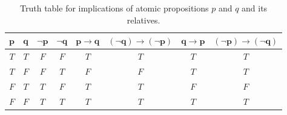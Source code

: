 \begin{table}[h]
    \centering
    \begin{tabular}{|c|c||c|c|c|c|c|c|}
        \hline $\mathbf{p}$ & $\mathbf{q}$ & $\mathbf{\neg p}$ & $\mathbf{\neg q}$ & $\mathbf{p \to q}$ & $\mathbf{(\neg q) \to (\neg p)}$ & $\mathbf{q \to p}$ & $\mathbf{(\neg p) \to (\neg q)}$ \\
        \hline \cellcolor{green!25}$T$ & \cellcolor{green!25}$T$ & \cellcolor{red!25}$F$ & \cellcolor{red!25}$F$ & \cellcolor{green!25}$T$ & \cellcolor{green!25}$T$ & \cellcolor{green!25}$T$ & \cellcolor{green!25}$T$ \\
        \hline \cellcolor{green!25}$T$ & \cellcolor{red!25}$F$ & \cellcolor{red!25}$F$ & \cellcolor{green!25}$T$ & \cellcolor{red!25}$F$ & \cellcolor{red!25}$F$ & \cellcolor{green!25}$T$ & \cellcolor{green!25}$T$ \\
        \hline \cellcolor{red!25}$F$ & \cellcolor{green!25}$T$ & \cellcolor{green!25}$T$ & \cellcolor{red!25}$F$ & \cellcolor{green!25}$T$ & \cellcolor{green!25}$T$ & \cellcolor{red!25}$F$ & \cellcolor{red!25}$F$ \\
        \hline \cellcolor{red!25}$F$ & \cellcolor{red!25}$F$ & \cellcolor{green!25}$T$ & \cellcolor{green!25}$T$ & \cellcolor{green!25}$T$ & \cellcolor{green!25}$T$ & \cellcolor{green!25}$T$ & \cellcolor{green!25}$T$ \\
        \hline
    \end{tabular}
        \caption{Truth table for implications of atomic propositions $p$ and $q$ and its relatives.}
        \label{tab:imptab}
\end{table}